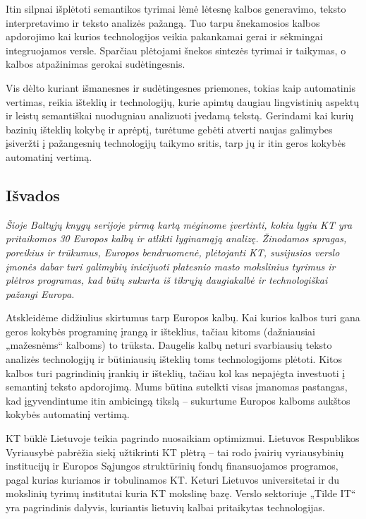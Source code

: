 \begin{multicols}{2}
  Itin silpnai išplėtoti semantikos tyrimai lėmė lėtesnę kalbos generavimo, teksto interpretavimo ir teksto analizės pažangą. Tuo tarpu šnekamosios kalbos apdorojimo kai kurios technologijos veikia pakankamai gerai ir sėkmingai integruojamos versle. Sparčiau plėtojami šnekos sintezės tyrimai ir taikymas, o kalbos atpažinimas gerokai sudėtingesnis.   

    Vis dėlto kuriant išmanesnes ir sudėtingesnes priemones, tokias kaip automatinis vertimas, reikia išteklių ir technologijų, kurie apimtų daugiau lingvistinių aspektų ir leistų semantiškai  nuodugniau analizuoti įvedamą tekstą. Gerindami kai kurių bazinių išteklių kokybę ir aprėptį, turėtume gebėti atverti naujas galimybes įsiveržti į pažangesnių technologijų taikymo sritis, tarp jų ir itin geros kokybės automatinį vertimą.

\subsection{Išvados}

\textit{Šioje Baltųjų knygų serijoje pirmą kartą mėginome įvertinti, kokiu lygiu KT yra pritaikomos 30 Europos kalbų ir atlikti lyginamąją analizę. Žinodamos spragas, poreikius ir trūkumus, Europos bendruomenė, plėtojanti KT, susijusios verslo įmonės dabar turi galimybių inicijuoti platesnio masto mokslinius tyrimus ir plėtros programas, kad būtų sukurta iš tikrųjų daugiakalbė ir technologiškai pažangi Europa.}

Atskleidėme didžiulius skirtumus tarp Europos kalbų. Kai kurios kalbos turi gana geros kokybės programinę įrangą ir išteklius, tačiau kitoms (dažniausiai „mažesnėms“ kalboms) to trūksta. Daugelis kalbų neturi svarbiausių teksto analizės technologijų ir būtiniausių išteklių toms technologijoms plėtoti. Kitos kalbos turi pagrindinių įrankių ir išteklių, tačiau kol kas nepajėgta investuoti į semantinį teksto apdorojimą. Mums būtina sutelkti visas įmanomas pastangas, kad įgyvendintume itin ambicingą tikslą – sukurtume Europos kalboms aukštos kokybės automatinį vertimą.   

    KT būklė Lietuvoje teikia pagrindo nuosaikiam optimizmui. Lietuvos Respublikos Vyriausybė pabrėžia siekį užtikrinti KT plėtrą – tai rodo įvairių vyriausybinių institucijų ir Europos Sąjungos struktūrinių fondų finansuojamos programos, pagal kurias kuriamos ir tobulinamos KT. Keturi Lietuvos universitetai ir du mokslinių tyrimų institutai kuria KT mokslinę bazę. Verslo sektoriuje „Tilde IT“ yra pagrindinis dalyvis, kuriantis lietuvių kalbai pritaikytas technologijas.   


\end{multicols}
